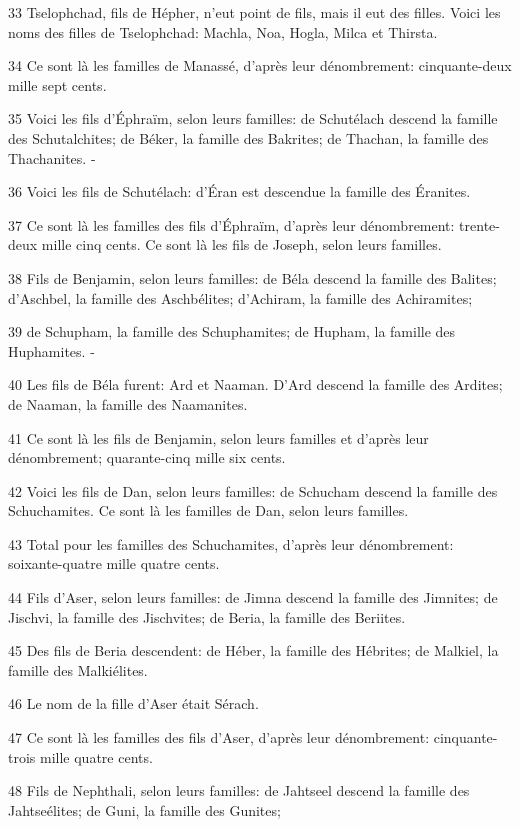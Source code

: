 \par 33 Tselophchad, fils de Hépher, n'eut point de fils, mais il eut des filles. Voici les noms des filles de Tselophchad: Machla, Noa, Hogla, Milca et Thirsta.
\par 34 Ce sont là les familles de Manassé, d'après leur dénombrement: cinquante-deux mille sept cents.
\par 35 Voici les fils d'Éphraïm, selon leurs familles: de Schutélach descend la famille des Schutalchites; de Béker, la famille des Bakrites; de Thachan, la famille des Thachanites. -
\par 36 Voici les fils de Schutélach: d'Éran est descendue la famille des Éranites.
\par 37 Ce sont là les familles des fils d'Éphraïm, d'après leur dénombrement: trente-deux mille cinq cents. Ce sont là les fils de Joseph, selon leurs familles.
\par 38 Fils de Benjamin, selon leurs familles: de Béla descend la famille des Balites; d'Aschbel, la famille des Aschbélites; d'Achiram, la famille des Achiramites;
\par 39 de Schupham, la famille des Schuphamites; de Hupham, la famille des Huphamites. -
\par 40 Les fils de Béla furent: Ard et Naaman. D'Ard descend la famille des Ardites; de Naaman, la famille des Naamanites.
\par 41 Ce sont là les fils de Benjamin, selon leurs familles et d'après leur dénombrement; quarante-cinq mille six cents.
\par 42 Voici les fils de Dan, selon leurs familles: de Schucham descend la famille des Schuchamites. Ce sont là les familles de Dan, selon leurs familles.
\par 43 Total pour les familles des Schuchamites, d'après leur dénombrement: soixante-quatre mille quatre cents.
\par 44 Fils d'Aser, selon leurs familles: de Jimna descend la famille des Jimnites; de Jischvi, la famille des Jischvites; de Beria, la famille des Beriites.
\par 45 Des fils de Beria descendent: de Héber, la famille des Hébrites; de Malkiel, la famille des Malkiélites.
\par 46 Le nom de la fille d'Aser était Sérach.
\par 47 Ce sont là les familles des fils d'Aser, d'après leur dénombrement: cinquante-trois mille quatre cents.
\par 48 Fils de Nephthali, selon leurs familles: de Jahtseel descend la famille des Jahtseélites; de Guni, la famille des Gunites;
